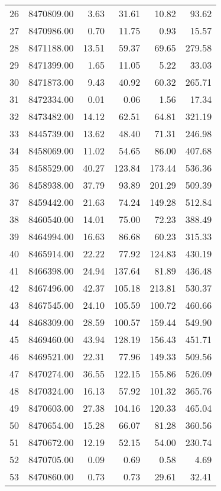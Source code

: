 \begin{table}[ht]
\begin{tabular}{rrrrrr}
  26 & 8470809.00 & 3.63 & 31.61 & 10.82 & 93.62 \\ 
  27 & 8470986.00 & 0.70 & 11.75 & 0.93 & 15.57 \\ 
  28 & 8471188.00 & 13.51 & 59.37 & 69.65 & 279.58 \\ 
  29 & 8471399.00 & 1.65 & 11.05 & 5.22 & 33.03 \\ 
  30 & 8471873.00 & 9.43 & 40.92 & 60.32 & 265.71 \\ 
  31 & 8472334.00 & 0.01 & 0.06 & 1.56 & 17.34 \\ 
  32 & 8473482.00 & 14.12 & 62.51 & 64.81 & 321.19 \\ 
  33 & 8445739.00 & 13.62 & 48.40 & 71.31 & 246.98 \\ 
  34 & 8458069.00 & 11.02 & 54.65 & 86.00 & 407.68 \\ 
  35 & 8458529.00 & 40.27 & 123.84 & 173.44 & 536.36 \\ 
  36 & 8458938.00 & 37.79 & 93.89 & 201.29 & 509.39 \\ 
  37 & 8459442.00 & 21.63 & 74.24 & 149.28 & 512.84 \\ 
  38 & 8460540.00 & 14.01 & 75.00 & 72.23 & 388.49 \\ 
  39 & 8464994.00 & 16.63 & 86.68 & 60.23 & 315.33 \\ 
  40 & 8465914.00 & 22.22 & 77.92 & 124.83 & 430.19 \\ 
  41 & 8466398.00 & 24.94 & 137.64 & 81.89 & 436.48 \\ 
  42 & 8467496.00 & 42.37 & 105.18 & 213.81 & 530.37 \\ 
  43 & 8467545.00 & 24.10 & 105.59 & 100.72 & 460.66 \\ 
  44 & 8468309.00 & 28.59 & 100.57 & 159.44 & 549.90 \\ 
  45 & 8469460.00 & 43.94 & 128.19 & 156.43 & 451.71 \\ 
  46 & 8469521.00 & 22.31 & 77.96 & 149.33 & 509.56 \\ 
  47 & 8470274.00 & 36.55 & 122.15 & 155.86 & 526.09 \\ 
  48 & 8470324.00 & 16.13 & 57.92 & 101.32 & 365.76 \\ 
  49 & 8470603.00 & 27.38 & 104.16 & 120.33 & 465.04 \\ 
  50 & 8470654.00 & 15.28 & 66.07 & 81.28 & 360.56 \\ 
  51 & 8470672.00 & 12.19 & 52.15 & 54.00 & 230.74 \\ 
  52 & 8470705.00 & 0.09 & 0.69 & 0.58 & 4.69 \\ 
  53 & 8470860.00 & 0.73 & 0.73 & 29.61 & 32.41 \\ 

\end{tabular}
\end{table}
